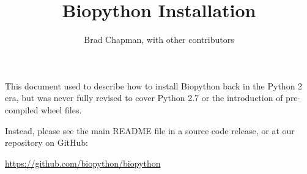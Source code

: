 \documentclass{article}
\begin{document}
\title{Biopython Installation}
\author{Brad Chapman, with other contributors}

\maketitle

This document used to describe how to install Biopython back in the
Python 2 era, but was never fully revised to cover Python 2.7 or the
introduction of pre-compiled wheel files.

Instead, please see the main README file in a source code release, or
at our repository on GitHub:

\noindent\url{https://github.com/biopython/biopython}
\end{document}
